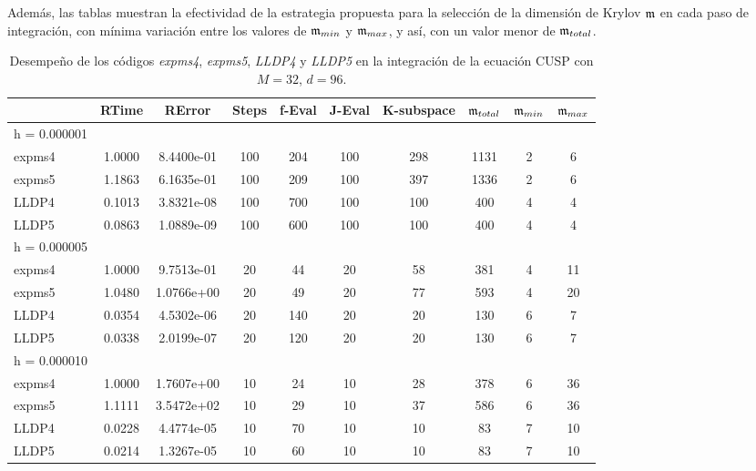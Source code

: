 Además, las tablas muestran la efectividad de la estrategia propuesta para la selección de la dimensión de Krylov $\mathfrak{m}$ en cada paso de integración, con mínima variación entre los valores de $\mathfrak{m}_{min}$ y $\mathfrak{m}_{max}$, y así, con un valor menor de $\mathfrak{m}_{total}$.

\begin{table}[h]
	\caption{Desempeño de los códigos \emph{expms4}, \emph{expms5}, \emph{LLDP4} y \emph{LLDP5} en la integración de la ecuación CUSP con $M=32$, $d=96$.}
	\centering
		\begin{tabular}{lccccccccc}
			\hline
			& RTime & RError & Steps & f-Eval & J-Eval & K-subspace & $\mathfrak{m}_{total}$ & $\mathfrak{m}_{min}$ & $\mathfrak{m}_{max}$ \\
			\hline
			h = 0.000001 &  &  &  &  &  &  &  &  &  \\
			expms4 & 1.0000 & 8.4400e-01 & 100 & 204 & 100 & 298 & 1131 & 2 & 6  \\
			expms5 & 1.1863 & 6.1635e-01 & 100 & 209 & 100 & 397 & 1336 & 2 & 6  \\
			LLDP4 & 0.1013 & 3.8321e-08 & 100 & 700 & 100 & 100 & 400 & 4 & 4  \\
			LLDP5 & 0.0863 & 1.0889e-09 & 100 & 600 & 100 & 100 & 400 & 4 & 4  \\
			\hline
			h = 0.000005 &  &  &  &  &  &  &  &  &  \\
			expms4 & 1.0000 & 9.7513e-01 & 20 & 44 & 20 & 58 & 381 & 4 & 11  \\
			expms5 & 1.0480 & 1.0766e+00 & 20 & 49 & 20 & 77 & 593 & 4 & 20  \\
			LLDP4 & 0.0354 & 4.5302e-06 & 20 & 140 & 20 & 20 & 130 & 6 & 7  \\
			LLDP5 & 0.0338 & 2.0199e-07 & 20 & 120 & 20 & 20 & 130 & 6 & 7  \\
			\hline
			h = 0.000010 &  &  &  &  &  &  &  &  &  \\
			expms4 & 1.0000 & 1.7607e+00 & 10 & 24 & 10 & 28 & 378 & 6 & 36  \\
			expms5 & 1.1111 & 3.5472e+02 & 10 & 29 & 10 & 37 & 586 & 6 & 36  \\
			LLDP4 & 0.0228 & 4.4774e-05 & 10 & 70 & 10 & 10 & 83 & 7 & 10  \\
			LLDP5 & 0.0214 & 1.3267e-05 & 10 & 60 & 10 & 10 & 83 & 7 & 10  \\
			\hline
		\end{tabular}
	\label{tab:num-exp-lldp-fix-step:cpna}
\end{table}



